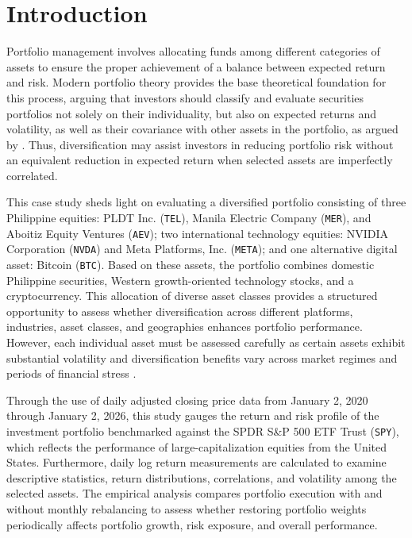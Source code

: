 \section{Introduction}

Portfolio management involves allocating funds among different categories of assets to ensure the proper achievement of a balance between expected return and risk. Modern portfolio theory provides the base theoretical foundation for this process, arguing that investors should classify and evaluate securities portfolios not solely on their individuality, but also on expected returns and volatility, as well as their covariance with other assets in the portfolio, as argued by \textcite{markowitz1952}. Thus, diversification may assist investors in reducing portfolio risk without an equivalent reduction in expected return when selected assets are imperfectly correlated.

This case study sheds light on evaluating a diversified portfolio consisting of three Philippine equities: PLDT Inc. (\texttt{TEL}), Manila Electric Company (\texttt{MER}), and Aboitiz Equity Ventures (\texttt{AEV}); two international technology equities: NVIDIA Corporation (\texttt{NVDA}) and Meta Platforms, Inc. (\texttt{META}); and one alternative digital asset: Bitcoin (\texttt{BTC}). Based on these assets, the portfolio combines domestic Philippine securities, Western growth-oriented technology stocks, and a cryptocurrency. This allocation of diverse asset classes provides a structured opportunity to assess whether diversification across different platforms, industries, asset classes, and geographies enhances portfolio performance. However, each individual asset must be assessed carefully as certain assets exhibit substantial volatility and diversification benefits vary across market regimes and periods of financial stress \parencite{almeida2023}.

Through the use of daily adjusted closing price data from January 2, 2020 through January 2, 2026, this study gauges the return and risk profile of the investment portfolio benchmarked against the SPDR S\&P 500 ETF Trust (\texttt{SPY}), which reflects the performance of large-capitalization equities from the United States. Furthermore, daily log return measurements are calculated to examine descriptive statistics, return distributions, correlations, and volatility among the selected assets. The empirical analysis compares portfolio execution with and without monthly rebalancing to assess whether restoring portfolio weights periodically affects portfolio growth, risk exposure, and overall performance.

